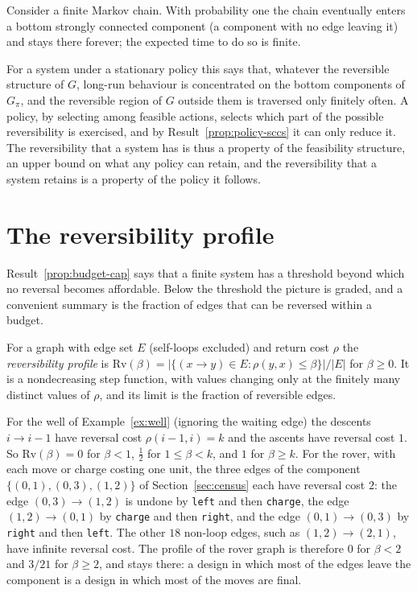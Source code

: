 \begin{established}\label{thm:absorb}
Consider a finite Markov chain. With probability one the chain eventually enters a bottom strongly connected component (a component with no edge leaving it) and stays there forever; the expected time to do so is finite.
\end{established}

For a system under a stationary policy this says that, whatever the reversible structure of $G$, long-run behaviour is concentrated on the bottom components of $G_\pi$, and the reversible region of $G$ outside them is traversed only finitely often. A policy, by selecting among feasible actions, selects which part of the possible reversibility is exercised, and by Result~\ref{prop:policy-sccs} it can only reduce it. The reversibility that a system has is thus a property of the feasibility structure, an upper bound on what any policy can retain, and the reversibility that a system retains is a property of the policy it follows.


\section{The reversibility profile}\label{sec:rev-profile}

Result~\ref{prop:budget-cap} says that a finite system has a threshold beyond which no reversal becomes affordable. Below the threshold the picture is graded, and a convenient summary is the fraction of edges that can be reversed within a budget.

\begin{definition}\label{def:rev-profile}
For a graph with edge set $E$ (self-loops excluded) and return cost $\rho$ the \emph{reversibility profile} is $\mathrm{Rv}(\beta)=|\{(x\to y)\in E:\rho(y,x)\le\beta\}|/|E|$ for $\beta\ge0$. It is a nondecreasing step function, with values changing only at the finitely many distinct values of $\rho$, and its limit is the fraction of reversible edges.
\end{definition}

For the well of Example~\ref{ex:well} (ignoring the waiting edge) the descents $i\to i-1$ have reversal cost $\rho(i-1,i)=k$ and the ascents have reversal cost $1$. So $\mathrm{Rv}(\beta)=0$ for $\beta<1$, $\tfrac12$ for $1\le\beta<k$, and $1$ for $\beta\ge k$. For the rover, with each move or charge costing one unit, the three edges of the component $\{(0,1),(0,3),(1,2)\}$ of Section~\ref{sec:census} each have reversal cost $2$: the edge $(0,3)\to(1,2)$ is undone by \texttt{left} and then \texttt{charge}, the edge $(1,2)\to(0,1)$ by \texttt{charge} and then \texttt{right}, and the edge $(0,1)\to(0,3)$ by \texttt{right} and then \texttt{left}. The other $18$ non-loop edges, such as $(1,2)\to(2,1)$, have infinite reversal cost. The profile of the rover graph is therefore $0$ for $\beta<2$ and $3/21$ for $\beta\ge2$, and stays there: a design in which most of the edges leave the component is a design in which most of the moves are final.

